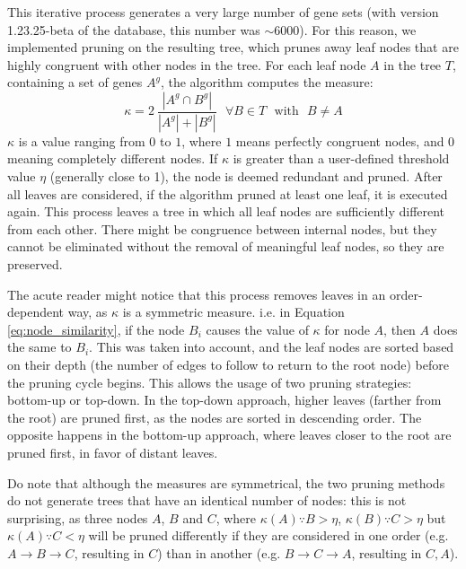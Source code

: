 This iterative process generates a very large number of gene sets (with version 1.23.25-beta of the database, this number was $\sim 6000$).
For this reason, we implemented pruning on the resulting tree, which prunes away leaf nodes that are highly congruent with other nodes in the tree.
For each leaf node $A$ in the tree $T$, containing a set of genes $A^g$, the algorithm computes the measure:
\begin{equation}
    \kappa = 2\ \frac{\left|A^g \cap B^g\right|}{\left|A^g\right|+\left|B^g\right|}
    \ \ \ \forall B \in T \ \ \ \text{with}\ \ \  B \neq A
    \label{eq:node_similarity}
\end{equation}
$\kappa$ is a value ranging from $0$ to $1$, where $1$ means perfectly congruent nodes, and $0$ meaning completely different nodes.
If $\kappa$ is greater than a user-defined threshold value $\eta$ (generally close to 1), the node is deemed redundant and pruned.
After all leaves are considered, if the algorithm pruned at least one leaf, it is executed again.
This process leaves a tree in which all leaf nodes are sufficiently different from each other.
There might be congruence between internal nodes, but they cannot be eliminated
without the removal of meaningful leaf nodes, so they are preserved.

The acute reader might notice that this process removes leaves in an order-dependent way, as $\kappa$ is a symmetric measure. i.e. in Equation \ref{eq:node_similarity}, if the node $B_i$ causes the value of $\kappa$ for node $A$, then $A$ does the same to $B_i$.
This was taken into account, and the leaf nodes are sorted based on their depth (the number of edges to follow to return to the root node) before the pruning cycle begins.
This allows the usage of two pruning strategies: bottom-up or top-down.
In the top-down approach, higher leaves (farther from the root) are pruned first, as the nodes are sorted in descending order.
The opposite happens in the bottom-up approach, where leaves closer to the root are pruned first, in favor of distant leaves.

Do note that although the measures are symmetrical, the two pruning methods do
not generate trees that have an identical number of nodes:
this is not surprising, as three nodes $A$, $B$ and $C$, where $\kappa(A) \because B > \eta$, $\kappa(B) \because C > \eta$ but $\kappa(A)  \because C < \eta$ will be pruned differently if they are considered in one order (e.g. $A \rightarrow B \rightarrow C$, resulting in $C$) than in another (e.g. $B \rightarrow C \rightarrow A$, resulting in $C, A$).

